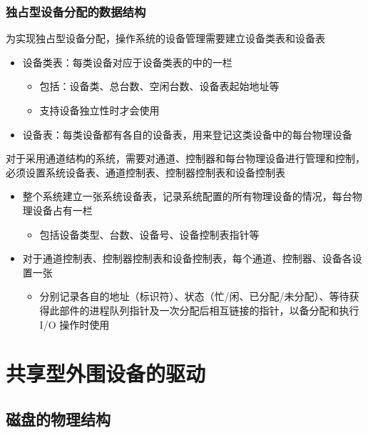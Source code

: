 \documentclass[cs4size,a4paper,10pt]{ctexart}
\begin{document}
	\subsubsection{独占型设备分配的数据结构}
	为实现独占型设备分配，操作系统的设备管理需要建立设备类表和设备表
	\begin{itemize}
		\item 设备类表：每类设备对应于设备类表的中的一栏
		\begin{itemize}
			\item 包括：设备类、总台数、空闲台数、设备表起始地址等
			\item 支持设备独立性时才会使用
		\end{itemize}
		\item 设备表：每类设备都有各自的设备表，用来登记这类设备中的每台物理设备
	\end{itemize}

	对于采用通道结构的系统，需要对通道、控制器和每台物理设备进行管理和控制，必须设置系统设备表、通道控制表、控制器控制表和设备控制表
	\begin{itemize}
		\item 整个系统建立一张系统设备表，记录系统配置的所有物理设备的情况，每台物理设备占有一栏
		\begin{itemize}
			\item 包括设备类型、台数、设备号、设备控制表指针等
		\end{itemize}
		\item 对于通道控制表、控制器控制表和设备控制表，每个通道、控制器、设备各设置一张
		\begin{itemize}
			\item 分别记录各自的地址（标识符）、状态（忙/闲、已分配/未分配）、等待获得此部件的进程队列指针及一次分配后相互链接的指针，以备分配和执行 I/O 操作时使用
		\end{itemize}
	\end{itemize}


	\section{共享型外围设备的驱动}
	\subsection{磁盘的物理结构}
\end{document}
